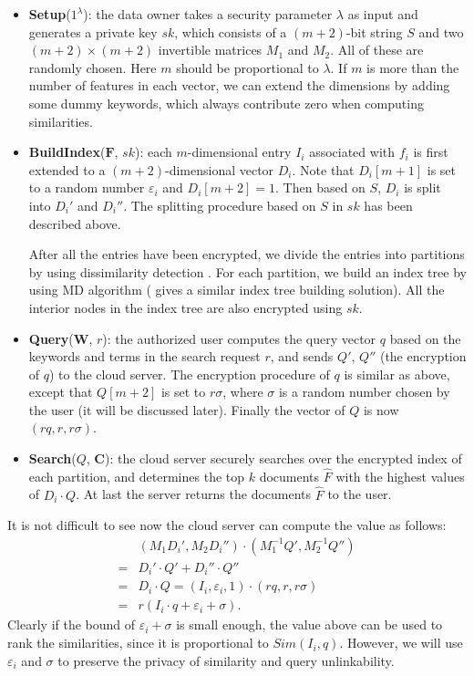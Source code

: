 \documentclass{IEEEtran}
\begin{document}
\begin{itemize}
\item \textbf{Setup}($1^\lambda$): the data owner takes a security parameter $\lambda$ as input and generates a private key $sk$, which consists of a $(m+2)$-bit string $S$ and two $(m+2)\times (m+2)$ invertible matrices $M_1$ and $M_2$. All of these are randomly chosen. Here $m$ should be proportional to $\lambda$. If $m$ is more than the number of features in each vector, we can extend the dimensions by adding some dummy keywords, which always contribute zero when computing similarities.
\item \textbf{BuildIndex}($\mathbf{F}$, $sk$): each $m$-dimensional entry $I_i$ associated with $f_i$ is first extended to a $(m+2)$-dimensional vector $D_i$. Note that $D_i[m+1]$ is set to a random number $\varepsilon_i$ and $D_i[m+2]=1$. Then based on $S$, $D_i$ is split into $D_i'$ and $D_i''$. The splitting procedure based on $S$ in $sk$ has been described above. 

After all the entries have been encrypted, we divide the entries into partitions by using dissimilarity detection \cite{TAJY14}. For each partition, we build an index tree by using MD algorithm \cite{Sun13} (\cite{Xia16} gives a similar index tree building solution). All the interior nodes in the index tree are also encrypted using $sk$.
\item \textbf{Query}($\mathbf{W}$, $r$): the authorized user computes the query vector $q$ based on the keywords and terms in the search request $r$, and sends $Q'$, $Q''$ (the encryption of $q$) to the cloud server. The encryption procedure of $q$ is similar as above, except that $Q[m+2]$ is set to $r\sigma$, where $\sigma$ is a random number chosen by the user (it will be discussed later). Finally the vector of $Q$ is now $(rq,r,r\sigma)$.
\item \textbf{Search}($Q$, $\mathbf{C}$): the cloud server securely searches over the encrypted index of each partition, and determines the top $k$ documents $\hat{F}$ with the highest values of $D_i\cdot Q$. At last the server returns the documents $\hat{F}$ to the user.
\end{itemize}
It is not difficult to see now the cloud server can compute the value as follows:
\begin{equation*}
\begin{aligned}
&(M_1D_i', M_2D_i'')\cdot(M_1^{-1}Q', M_2^{-1}Q'') \\
=&D_i'\cdot Q' + D_i''\cdot Q''\\
=&D_i \cdot Q = (I_i,\varepsilon_i,1)\cdot (rq,r,r\sigma)\\
=&r(I_i\cdot q+\varepsilon_i+\sigma).
\end{aligned}
\end{equation*}
Clearly if the bound of $\varepsilon_i+\sigma$ is small enough, the value above can be used to rank the similarities, since it is proportional to $Sim(I_i, q)$. However, we will use $\varepsilon_i$ and $\sigma$ to preserve the privacy of similarity and query unlinkability. 
\end{document}
